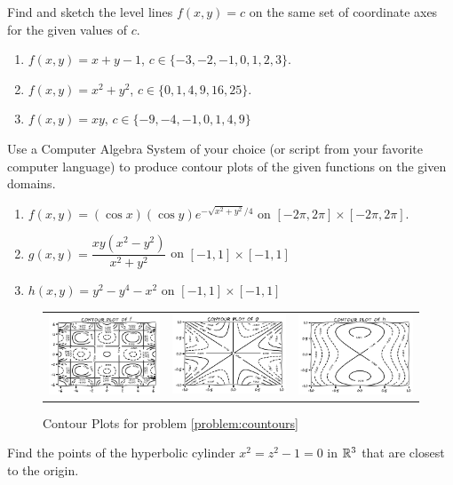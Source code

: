 \begin{problem}
Find and sketch the level lines $f(x,y)=c$ on the same set of coordinate axes for the given values of $c$.
\begin{enumerate}
	\item $f(x,y) = x+y-1$, $c \in \{ -3, -2, -1, 0, 1, 2, 3\}$.
	\item $f(x,y) = x^2+y^2$, $c \in \{ 0, 1, 4, 9, 16, 25 \}$.
	\item $f(x,y) = xy$, $c \in \{ -9, -4, -1, 0, 1, 4, 9 \}$
\end{enumerate}
\end{problem}

\begin{problem}\label{problem:countours}
Use a Computer Algebra System of your choice (or script from your favorite computer language) to produce contour plots of the given functions on the given domains.
\begin{enumerate}
	\item $f(x,y) = (\cos x)(\cos y) e^{-\sqrt{x^2+y^2}/4}$ on $[-2\pi, 2\pi]\times [-2\pi, 2\pi]$.
	\item $g(x,y) = \dfrac{xy(x^2-y^2)}{x^2+y^2}$ on $[-1,1] \times [-1,1]$
	\item $h(x,y) = y^2 - y^4 -x^2$ on $[-1,1]\times[-1,1]$
\end{enumerate}
\begin{figure}[ht!]
\begin{tabular}{ccc}
\includegraphics[width=0.33\linewidth]{contourf.png} &
\includegraphics[width=0.33\linewidth]{contourg.png} &
\includegraphics[width=0.33\linewidth]{contourh.png}
\end{tabular}
\caption{Contour Plots for problem \ref{problem:countours}}
\end{figure}
\end{problem}

\begin{problem} %
Find the points of the hyperbolic cylinder $x^2=z^2-1=0$ in $\mathbb{R}^3$ that are closest to the origin.
\end{problem}